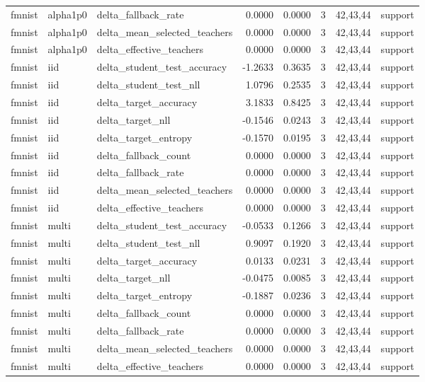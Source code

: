 \begin{tabular}{lllrrrll}
fmnist & alpha1p0 & delta\_fallback\_rate & 0.0000 & 0.0000 & 3 & 42,43,44 & support \\
fmnist & alpha1p0 & delta\_mean\_selected\_teachers & 0.0000 & 0.0000 & 3 & 42,43,44 & support \\
fmnist & alpha1p0 & delta\_effective\_teachers & 0.0000 & 0.0000 & 3 & 42,43,44 & support \\
fmnist & iid & delta\_student\_test\_accuracy & -1.2633 & 0.3635 & 3 & 42,43,44 & support \\
fmnist & iid & delta\_student\_test\_nll & 1.0796 & 0.2535 & 3 & 42,43,44 & support \\
fmnist & iid & delta\_target\_accuracy & 3.1833 & 0.8425 & 3 & 42,43,44 & support \\
fmnist & iid & delta\_target\_nll & -0.1546 & 0.0243 & 3 & 42,43,44 & support \\
fmnist & iid & delta\_target\_entropy & -0.1570 & 0.0195 & 3 & 42,43,44 & support \\
fmnist & iid & delta\_fallback\_count & 0.0000 & 0.0000 & 3 & 42,43,44 & support \\
fmnist & iid & delta\_fallback\_rate & 0.0000 & 0.0000 & 3 & 42,43,44 & support \\
fmnist & iid & delta\_mean\_selected\_teachers & 0.0000 & 0.0000 & 3 & 42,43,44 & support \\
fmnist & iid & delta\_effective\_teachers & 0.0000 & 0.0000 & 3 & 42,43,44 & support \\
fmnist & multi & delta\_student\_test\_accuracy & -0.0533 & 0.1266 & 3 & 42,43,44 & support \\
fmnist & multi & delta\_student\_test\_nll & 0.9097 & 0.1920 & 3 & 42,43,44 & support \\
fmnist & multi & delta\_target\_accuracy & 0.0133 & 0.0231 & 3 & 42,43,44 & support \\
fmnist & multi & delta\_target\_nll & -0.0475 & 0.0085 & 3 & 42,43,44 & support \\
fmnist & multi & delta\_target\_entropy & -0.1887 & 0.0236 & 3 & 42,43,44 & support \\
fmnist & multi & delta\_fallback\_count & 0.0000 & 0.0000 & 3 & 42,43,44 & support \\
fmnist & multi & delta\_fallback\_rate & 0.0000 & 0.0000 & 3 & 42,43,44 & support \\
fmnist & multi & delta\_mean\_selected\_teachers & 0.0000 & 0.0000 & 3 & 42,43,44 & support \\
fmnist & multi & delta\_effective\_teachers & 0.0000 & 0.0000 & 3 & 42,43,44 & support \\

\end{tabular}

